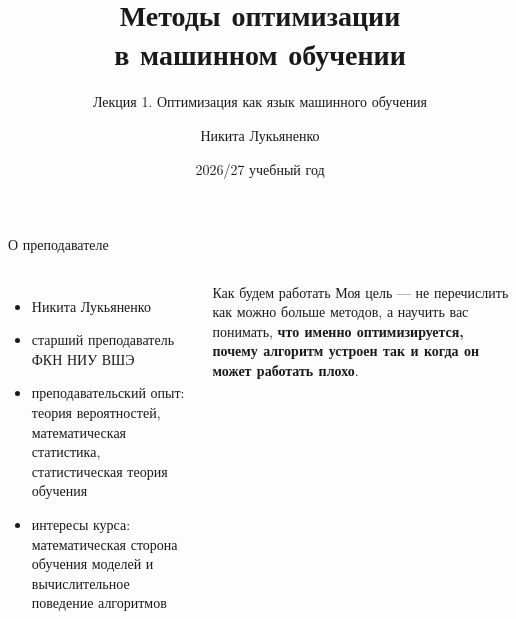 \documentclass[aspectratio=169,10pt]{beamer}
\title[Методы оптимизации в ML]{Методы оптимизации\\в машинном обучении}
\subtitle{Лекция 1. Оптимизация как язык машинного обучения}
\author[Н. Лукьяненко]{Никита Лукьяненко}
\institute{Совместная программа СМОЛ ГУ и ФКН НИУ ВШЭ}
\date{2026/27 учебный год}
\begin{document}
\frame[plain]{\titlepage}

\begin{frame}{О преподавателе}
\begin{columns}[T,onlytextwidth]
  \begin{itemize}
    \item Никита Лукьяненко
    \item старший преподаватель ФКН НИУ ВШЭ
    \item преподавательский опыт: теория вероятностей, математическая статистика, статистическая теория обучения
    \item интересы курса: математическая сторона обучения моделей и вычислительное поведение алгоритмов
  \end{itemize}
  \vspace{0.5em}
  \begin{block}{Как будем работать}
    Моя цель --- не перечислить как можно больше методов, а научить вас понимать, \textbf{что именно оптимизируется, почему алгоритм устроен так и когда он может работать плохо}.
  \end{block}
\end{columns}
\end{frame}
\end{document}
